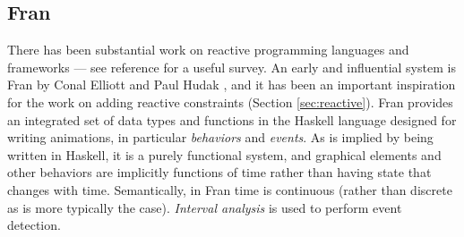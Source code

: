 \documentclass{sig-alternate-05-2015}
\begin{document}

\subsection{Fran}

There has been substantial work on reactive programming languages and
frameworks --- see reference \cite{bainomugisha-computing-surveys-2012} for
a useful survey.  An early and influential system is Fran by Conal Elliott
and Paul Hudak \cite{elliot-icfp-1997}, and it has been an important
inspiration for the work on adding reactive constraints (Section
\ref{sec:reactive}).  Fran provides an integrated set of data types and
functions in the Haskell language designed for writing animations, in
particular \emph{behaviors} and \emph{events}.  As is implied by being
written in Haskell, it is a purely functional system, and graphical
elements and other behaviors are implicitly functions of time rather than
having state that changes with time.  Semantically, in Fran time is
continuous (rather than discrete as is more typically the case).
\emph{Interval analysis} \cite{snyder-siggraph-1992} is used to perform
event detection.
\end{document}
